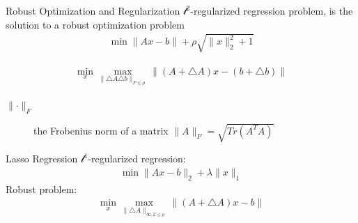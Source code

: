 \documentclass{beamer}
\begin{document}
\begin{frame}{Robust Optimization and Regularization}
$\mathcal{l}^{2}$-regularized regression problem, is the solution to a robust optimization problem
\begin{align*}
\min \lVert Ax - b \rVert + \rho\sqrt{\lVert x \rVert^{2}_{2} + 1}
\end{align*}

\begin{align*}
\min_{x} \max_{\lVert \triangle A \triangle b \rVert_{F \leq \rho}} \lVert (A + \triangle A)x - (b + \triangle b)\rVert
\end{align*}
\begin{description}
\item [$\lVert \cdot \rVert_{F}$] the Frobenius norm of a matrix $\lVert A \rVert_{F} = \sqrt{Tr(A^{T}A)}$
\end{description}
\end{frame}

\begin{frame}{Lasso Regression}
$\mathcal{l}^{1}$-regularized regression:
\begin{align*}
\min \lVert Ax - b \rVert_{2} + \lambda \lVert x \rVert_{1}
\end{align*}
Robust problem:
\begin{align*}
\min_{x} \max_{\lVert \triangle A \rVert_{\infty,2 \leq \rho}} \lVert (A + \triangle A)x - b\rVert
\end{align*}
\end{frame}
\end{document}
